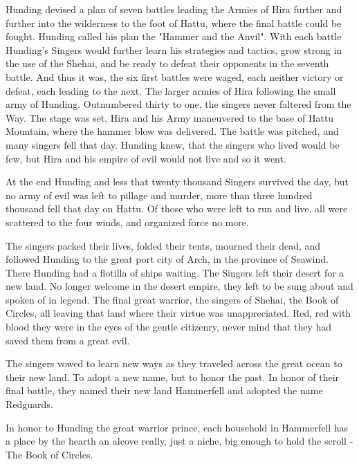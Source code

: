 Hunding devised a plan of seven battles leading the Armies of Hira further and further into the wilderness to the foot of Hattu, where the final battle could be fought. Hunding called his plan the "Hammer and the Anvil". With each battle Hunding's Singers would further learn his strategies and tactics, grow strong in the use of the Shehai, and be ready to defeat their opponents in the seventh battle. And thus it was, the six first battles were waged, each neither victory or defeat, each leading to the next. The larger armies of Hira following the small army of Hunding. Outnumbered thirty to one, the singers never faltered from the Way. The stage was set, Hira and his Army maneuvered to the base of Hattu Mountain, where the hammer blow was delivered. The battle was pitched, and many singers fell that day. Hunding knew, that the singers who lived would be few, but Hira and his empire of evil would not live and so it went.

At the end Hunding and less that twenty thousand Singers survived the day, but no army of evil was left to pillage and murder, more than three hundred thousand fell that day on Hattu. Of those who were left to run and live, all were scattered to the four winds, and organized force no more.

The singers packed their lives, folded their tents, mourned their dead, and followed Hunding to the great port city of Arch, in the province of Seawind. There Hunding had a flotilla of ships waiting. The Singers left their desert for a new land. No longer welcome in the desert empire, they left to be sung about and spoken of in legend. The final great warrior, the singers of Shehai, the Book of Circles, all leaving that land where their virtue was unappreciated. Red, red with blood they were in the eyes of the gentle citizenry, never mind that they had saved them from a great evil.

The singers vowed to learn new ways as they traveled across the great ocean to their new land. To adopt a new name, but to honor the past. In honor of their final battle, they named their new land Hammerfell and adopted the name Redguards.

In honor to Hunding the great warrior prince, each household in Hammerfell has a place by the hearth an alcove really, just a niche, big enough to hold the scroll - The Book of Circles.